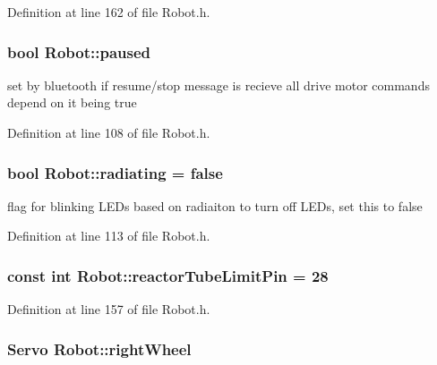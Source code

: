 Definition at line 162 of file Robot.\-h.

\hypertarget{classRobot_a6a1fae6e6ee0a3298b9e60d3f50ad12a}{
\subsubsection[{paused}]{\setlength{\rightskip}{0pt plus 5cm}bool Robot\-::paused}}\label{classRobot_a6a1fae6e6ee0a3298b9e60d3f50ad12a}


set by bluetooth if resume/stop message is recieve all drive motor commands depend on it being true 



Definition at line 108 of file Robot.\-h.

\hypertarget{classRobot_a77f62d85ab1cf34e79c2a3acd470a4ce}{
\subsubsection[{radiating}]{\setlength{\rightskip}{0pt plus 5cm}bool Robot\-::radiating = false}}\label{classRobot_a77f62d85ab1cf34e79c2a3acd470a4ce}


flag for blinking L\-E\-Ds based on radiaiton to turn off L\-E\-Ds, set this to false 



Definition at line 113 of file Robot.\-h.

\hypertarget{classRobot_a351d754436c8f569432ef7a06641f98a}{
\subsubsection[{reactor\-Tube\-Limit\-Pin}]{\setlength{\rightskip}{0pt plus 5cm}const int Robot\-::reactor\-Tube\-Limit\-Pin = 28\hspace{0.3cm}{\ttfamily [private]}}}\label{classRobot_a351d754436c8f569432ef7a06641f98a}


Definition at line 157 of file Robot.\-h.

\hypertarget{classRobot_a3b2dd5b89e44fd3a7ba239554fb5b8a7}{
\subsubsection[{right\-Wheel}]{\setlength{\rightskip}{0pt plus 5cm}Servo Robot\-::right\-Wheel\hspace{0.3cm}{\ttfamily [private]}}}\label{classRobot_a3b2dd5b89e44fd3a7ba239554fb5b8a7}


